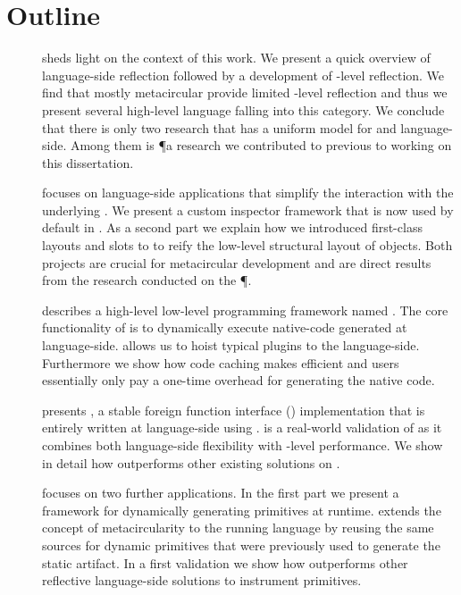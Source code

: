 \section{Outline}

\begin{description}
\item[] sheds light on the context of this work.
	We present a quick overview of language-side reflection followed by a development of \VM-level reflection.
	We find that mostly metacircular \VMs provide limited \VM-level reflection and thus we present several high-level language \VMs falling into this category.
	We conclude that there is only two research \VM that has a uniform model for \VM and language-side.
	Among them is \P a research \ST \VM we contributed to previous to working on this dissertation.

\item[] focuses on language-side applications that simplify the interaction with the underlying \VM.
	We present a custom inspector framework that is now used by default in \PH.
	As a second part we explain how we introduced first-class layouts and slots to \PH to reify the low-level structural layout of objects.
	Both projects are crucial for metacircular \VM development and are direct results from the research conducted on the \P \VM.

\item[] describes a high-level low-level programming framework named \B.
	The core functionality of \B is to dynamically execute native-code generated at language-side.
	\B allows us to hoist typical \VM plugins to the language-side.
	Furthermore we show how code caching makes \B efficient and users essentially only pay a one-time overhead for generating the native code.
	
\item[] presents \NB, a stable foreign function interface (\FFI) implementation that is entirely written at language-side using \B.
	\NB is a real-world validation of \B as it combines both language-side flexibility with \VM-level performance.
	We show in detail how \NB outperforms other existing \FFI solutions on \PH.

\item[] focuses on two further \B applications.
	In the first part we present \WF a framework for dynamically generating primitives at runtime.
	\WF extends the concept of metacircularity to the running language by reusing the same sources for dynamic primitives that were previously used to generate the static \VM artifact.
	In a first validation we show how \WF outperforms other reflective language-side solutions to instrument primitives.
	

\end{description}
